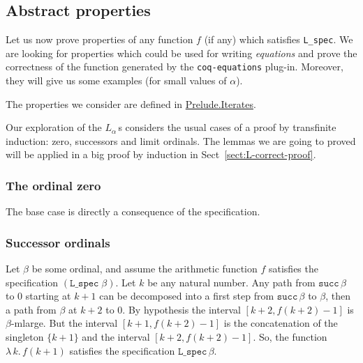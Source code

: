 


\subsection{Abstract properties}



Let us now prove properties of any function $f$ (if any) which satisfies 
\texttt{L\_spec}. We are looking for properties which could be used for writing \emph{equations} and prove the correctness of the function generated by the \texttt{coq-equations} plug-in. Moreover, they will give us some examples (for small values of $\alpha$).

The properties we consider are defined in \href{../theories/html/hydras.Prelude.Iterates.html\#fun_le}{Prelude.Iterates}.

\label{sect:abstract-arith-prop}



Our exploration of the $L_\alpha$\,s  considers the usual cases of a proof by transfinite induction: zero, successors and limit ordinals. The lemmas we are going to proved will be applied in a big proof by induction in Sect~\vref{sect:L-correct-proof}.


\subsubsection{The  ordinal zero}
\label{sect:L-spec-zero}
The base case is directly a consequence of the specification.




\subsubsection{Successor ordinals}
\label{sect:L-spec-succ}
Let $\beta$ be some ordinal, and assume the arithmetic function $f$ satisfies 
the specification $(\texttt{L\_spec}\;\beta)$.  Let $k$ be any natural number.
Any path from $\texttt{succ}\,\beta$ to $0$ starting at $k+1$ can be decomposed into a first step from $\texttt{succ}\,\beta$ to $\beta$, then a path from
$\beta$ at $k+2$ to $0$. 
By hypothesis the interval $[k+2, f(k+2)-1]$ is $\beta$-mlarge.
But the interval $[k+1, f(k+2)-1]$ is the concatenation of the singleton
$\{k+1\}$ and the interval $[k+2, f(k+2)-1]$.
So, the function $\lambda\,k.\,f(k+1)$ satisfies the specification $\texttt{L\_spec}\,\beta$.


